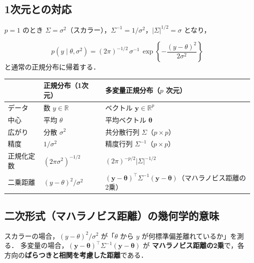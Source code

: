 \documentclass[lualatex,ja=standard,a4paper,12pt]{bxjsarticle}
\begin{document}
\subsection{1次元との対応}

$p = 1$ のとき $\Sigma = \sigma^2$（スカラー），$\Sigma^{-1} = 1/\sigma^2$，$|\Sigma|^{1/2} = \sigma$ となり，

\[
  p(y \mid \theta, \sigma^2)
  = (2\pi)^{-1/2}\,\sigma^{-1}\,\exp\!\left\{-\frac{(y-\theta)^2}{2\sigma^2}\right\}
\]
と通常の正規分布に帰着する．

\begin{center}
\renewcommand{\arraystretch}{1.6}
\begin{tabular}{lll}
\toprule
 & 正規分布（1次元） & 多変量正規分布（$p$ 次元） \\
\midrule
データ & 数 $y \in \mathbb{R}$ & ベクトル $\bm{y} \in \mathbb{R}^p$ \\
中心 & 平均 $\theta$ & 平均ベクトル $\bm{\theta}$ \\
広がり & 分散 $\sigma^2$ & 共分散行列 $\Sigma$（$p\times p$）\\
精度 & $1/\sigma^2$ & 精度行列 $\Sigma^{-1}$（$p\times p$）\\
正規化定数 & $(2\pi\sigma^2)^{-1/2}$ & $(2\pi)^{-p/2}|\Sigma|^{-1/2}$ \\
二乗距離 & $(y-\theta)^2/\sigma^2$ & $(\bm{y}-\bm{\theta})^\top\Sigma^{-1}(\bm{y}-\bm{\theta})$（マハラノビス距離の2乗）\\
\bottomrule
\end{tabular}
\end{center}

\subsection{二次形式（マハラノビス距離）の幾何学的意味}

スカラーの場合，$(y - \theta)^2/\sigma^2$ が「$\theta$ から $y$ が何標準偏差離れているか」を測る．
多変量の場合，$(\bm{y} - \bm{\theta})^\top \Sigma^{-1}(\bm{y} - \bm{\theta})$ が
\textbf{マハラノビス距離の2乗}で，各方向の\textbf{ばらつきと相関を考慮した距離}である．
\end{document}
